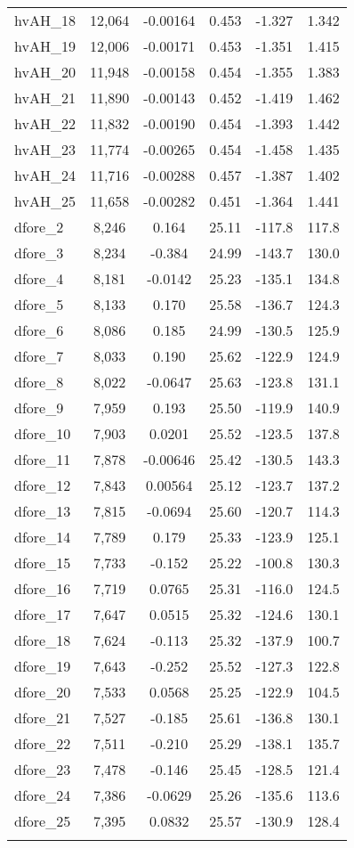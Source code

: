 \begin{tabular}{lccccc}
hvAH\_18 & 12,064 & -0.00164 & 0.453 & -1.327 & 1.342 \\
hvAH\_19 & 12,006 & -0.00171 & 0.453 & -1.351 & 1.415 \\
hvAH\_20 & 11,948 & -0.00158 & 0.454 & -1.355 & 1.383 \\
hvAH\_21 & 11,890 & -0.00143 & 0.452 & -1.419 & 1.462 \\
hvAH\_22 & 11,832 & -0.00190 & 0.454 & -1.393 & 1.442 \\
hvAH\_23 & 11,774 & -0.00265 & 0.454 & -1.458 & 1.435 \\
hvAH\_24 & 11,716 & -0.00288 & 0.457 & -1.387 & 1.402 \\
hvAH\_25 & 11,658 & -0.00282 & 0.451 & -1.364 & 1.441 \\
dfore\_2 & 8,246 & 0.164 & 25.11 & -117.8 & 117.8 \\
dfore\_3 & 8,234 & -0.384 & 24.99 & -143.7 & 130.0 \\
dfore\_4 & 8,181 & -0.0142 & 25.23 & -135.1 & 134.8 \\
dfore\_5 & 8,133 & 0.170 & 25.58 & -136.7 & 124.3 \\
dfore\_6 & 8,086 & 0.185 & 24.99 & -130.5 & 125.9 \\
dfore\_7 & 8,033 & 0.190 & 25.62 & -122.9 & 124.9 \\
dfore\_8 & 8,022 & -0.0647 & 25.63 & -123.8 & 131.1 \\
dfore\_9 & 7,959 & 0.193 & 25.50 & -119.9 & 140.9 \\
dfore\_10 & 7,903 & 0.0201 & 25.52 & -123.5 & 137.8 \\
dfore\_11 & 7,878 & -0.00646 & 25.42 & -130.5 & 143.3 \\
dfore\_12 & 7,843 & 0.00564 & 25.12 & -123.7 & 137.2 \\
dfore\_13 & 7,815 & -0.0694 & 25.60 & -120.7 & 114.3 \\
dfore\_14 & 7,789 & 0.179 & 25.33 & -123.9 & 125.1 \\
dfore\_15 & 7,733 & -0.152 & 25.22 & -100.8 & 130.3 \\
dfore\_16 & 7,719 & 0.0765 & 25.31 & -116.0 & 124.5 \\
dfore\_17 & 7,647 & 0.0515 & 25.32 & -124.6 & 130.1 \\
dfore\_18 & 7,624 & -0.113 & 25.32 & -137.9 & 100.7 \\
dfore\_19 & 7,643 & -0.252 & 25.52 & -127.3 & 122.8 \\
dfore\_20 & 7,533 & 0.0568 & 25.25 & -122.9 & 104.5 \\
dfore\_21 & 7,527 & -0.185 & 25.61 & -136.8 & 130.1 \\
dfore\_22 & 7,511 & -0.210 & 25.29 & -138.1 & 135.7 \\
dfore\_23 & 7,478 & -0.146 & 25.45 & -128.5 & 121.4 \\
dfore\_24 & 7,386 & -0.0629 & 25.26 & -135.6 & 113.6 \\
dfore\_25 & 7,395 & 0.0832 & 25.57 & -130.9 & 128.4 \\
 &  &  &  &  &  \\ \hline
\end{tabular}
